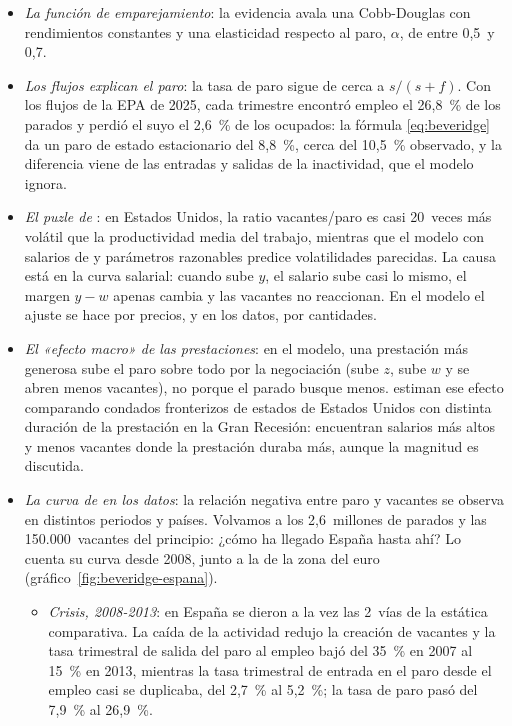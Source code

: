 \documentclass[11pt]{article}
\begin{document}
\begin{itemize}
\item \emph{La función de emparejamiento}: la evidencia avala una Cobb-Douglas con rendimientos constantes y una elasticidad respecto al paro, $\alpha$, de entre 0,5~y 0,7\nocite{PetrongoloPissarides2001Black}.
\item \emph{Los flujos explican el paro}: la tasa de paro sigue de cerca a $s/(s+f)$\nocite{RogersonShimerWright2005Search}. Con los flujos de la EPA de 2025, cada trimestre encontró empleo el 26,8~\% de los parados y perdió el suyo el 2,6~\% de los ocupados\nocite{INE2026EPAFlujos}: la fórmula \eqref{eq:beveridge} da un paro de estado estacionario del 8,8~\%, cerca del 10,5~\% observado, y la diferencia viene de las entradas y salidas de la inactividad, que el modelo ignora.
\item \emph{El puzle de }: en Estados Unidos, la ratio vacantes/paro es casi 20~veces más volátil que la productividad media del trabajo, mientras que el modelo con salarios de  y parámetros razonables predice volatilidades parecidas\nocite{Shimer2005Cyclical}. La causa está en la curva salarial: cuando sube $y$, el salario sube casi lo mismo, el margen $y-w$ apenas cambia y las vacantes no reaccionan. En el modelo el ajuste se hace por precios, y en los datos, por cantidades.
\item \emph{El «efecto macro» de las prestaciones}: en el modelo, una prestación más generosa sube el paro sobre todo por la negociación (sube $z$, sube $w$ y se abren menos vacantes), no porque el parado busque menos. \textcite{HagedornEtAl2013Unemployment} estiman ese efecto comparando condados fronterizos de estados de Estados Unidos con distinta duración de la prestación en la Gran Recesión: encuentran salarios más altos y menos vacantes donde la prestación duraba más, aunque la magnitud es discutida.
\item \emph{La curva de  en los datos}: la relación negativa entre paro y vacantes se observa en distintos periodos y países\nocite{ElsbyMichaelsRatner2015Beveridge}. Volvamos a los 2,6~millones de parados y las 150.000~vacantes del principio: ¿cómo ha llegado España hasta ahí? Lo cuenta su curva desde 2008, junto a la de la zona del euro (gráfico~\ref{fig:beveridge-espana}).
  \begin{itemize}
  \item \emph{Crisis, 2008-2013}: en España se dieron a la vez las 2~vías de la estática comparativa. La caída de la actividad redujo la creación de vacantes y la tasa trimestral de salida del paro al empleo bajó del 35~\% en 2007 al 15~\% en 2013, mientras la tasa trimestral de entrada en el paro desde el empleo casi se duplicaba, del 2,7~\% al 5,2~\%; la tasa de paro pasó del 7,9~\% al 26,9~\%\nocite{INE2026EPAFlujos,INE2026EPATabla65334}.

\end{itemize}
\end{itemize}
\end{document}
